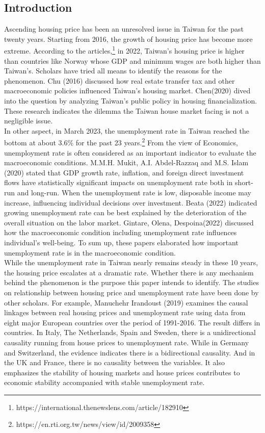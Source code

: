 \documentclass[12pt]{article}
\begin{document}
\begin{spacing}{2}
\section{Introduction}
Ascending housing price has been an unresolved issue in Taiwan for the past twenty years. Starting from 2016, the growth of housing price has become more extreme. According to the articles,\footnote[1]{https://international.thenewslens.com/article/182910} in 2022, Taiwan's housing price is higher than countries like Norway whose GDP and minimum wages are both higher than Taiwan's.  Scholars have tried all means to identify the reasons for the phenomenon. Chu (2016) discussed how real estate transfer tax and other macroeconomic policies influenced Taiwan’s housing market. Chen(2020) dived into the question by analyzing Taiwan's public policy in housing financialization. These research indicates the dilemma the Taiwan house market facing is not a negligible issue. \\
\hspace*{1cm} In other aspect, in March 2023, the unemployment rate in Taiwan reached the bottom at about 3.6\% for the past 23 years.\footnote[2]{https://en.rti.org.tw/news/view/id/2009358}
From the view of Economics, unemployment rate is often considered as an important indicator to evaluate the macroeconomic conditions. M.M.H. Mukit, A.I. Abdel-Razzaq and M.S. Islam (2020) stated that GDP growth rate, inflation, and foreign direct investment flows have statistically significant impacts on unemployment rate both in short-run and long-run. When the unemployment rate is low, disposable income may increase, influencing individual decisions over investment. Beata (2022) indicated growing unemployment rate can be best explained by the deterioration of the overall situation on the labor market. Gintare, Olena, Despoina(2022) discussed how the macroeconomic condition including unemployment rate influences individual's well-being. To sum up, these papers elaborated how important unemployment rate is in the macroeconomic condition.\\ 
\hspace*{1cm} While the unemployment rate in Taiwan nearly remains steady in these 10 years, the housing price escalates at a dramatic rate. Whether  there is any mechanism behind the phenomenon is the purpose this paper intends to identify. The studies on relationship between housing price and unemployment rate have been done by other scholars. For example, Manuchehr Irandoust (2019) examines the causal linkages between real housing prices and unemployment rate using data from eight major European countries over the period of 1991-2016. The result differs in countries. In Italy, The Netherlands, Spain and Sweden, there is a unidirectional causality running from house prices to unemployment rate. While in Germany and Switzerland, the evidence indicates there is a bidirectional causality. And in the UK and France, there is no causality between the variables. It also emphasizes the stability of housing markets and house prices contributes to economic stability accompanied with stable unemployment rate.\\

\end{spacing}
\end{document}
